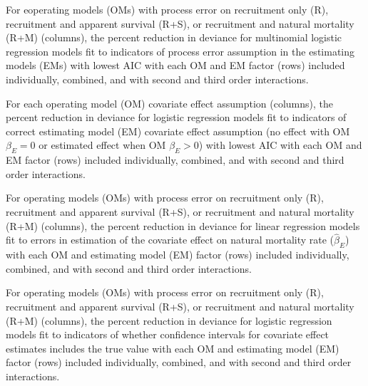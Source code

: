 \documentclass[
  12pt,
]{article}
\begin{document}
\begin{table}
\caption{For eoperating models (OMs) with process error on recruitment only (R), recruitment and apparent survival (R+S), or recruitment and natural mortality (R+M) (columns), the percent reduction in deviance for multinomial logistic regression models fit to indicators of process error assumption in the estimating models (EMs) with lowest AIC with each OM and EM factor (rows) included individually, combined, and with second and third order interactions.}\label{AIC_PE_PRD_table}
{}
\end{table}
\pagebreak

\begin{table}
\caption{For each operating model (OM) covariate effect assumption (columns), the percent reduction in deviance for logistic regression models fit to indicators of correct estimating model (EM) covariate effect assumption (no effect with OM $\beta_E = 0$ or estimated effect when OM $\beta_E > 0$) with lowest AIC with each OM and EM factor (rows) included individually, combined, and with second and third order interactions.}\label{AIC_Ecov_effect_PRD_table}
{}
\end{table}
\pagebreak

\begin{table}
\caption{For operating models (OMs) with process error on recruitment only (R), recruitment and apparent survival (R+S), or recruitment and natural mortality (R+M)  (columns), the percent reduction in deviance for linear regression models fit to errors in estimation of the covariate effect on natural mortality rate ($\widehat \beta_E$) with each OM and estimating model (EM) factor (rows) included individually, combined, and with second and third order interactions.}\label{bias_ecov_beta_converged_PRD_table}
{}
\end{table}
\pagebreak

\begin{table}
\caption{For operating models (OMs) with process error on recruitment only (R), recruitment and apparent survival (R+S), or recruitment and natural mortality (R+M) (columns), the percent reduction in deviance for logistic regression models fit to indicators of whether confidence intervals for covariate effect estimates includes the true value with each OM and estimating model (EM) factor (rows) included individually, combined, and with second and third order interactions.}\label{ecov_beta_ci_coverage_PRD_table}
{}
\end{table}
\pagebreak
\end{document}
